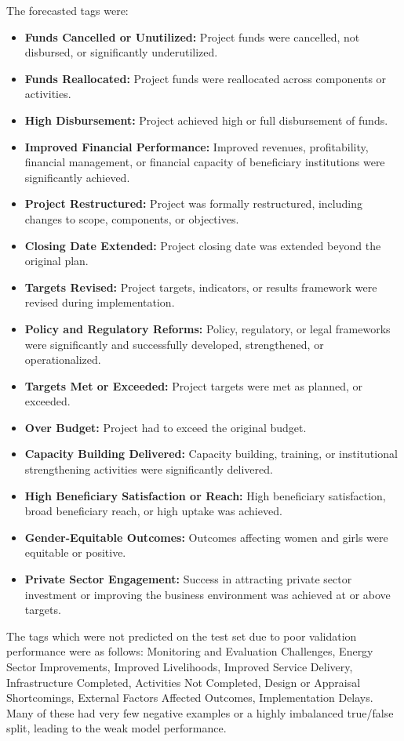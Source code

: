 The forecasted tags were:
\begin{itemize}
    \item \textbf{Funds Cancelled or Unutilized:} Project funds were cancelled, not disbursed, or significantly underutilized.
    \item \textbf{Funds Reallocated:} Project funds were reallocated across components or activities.
    \item \textbf{High Disbursement:} Project achieved high or full disbursement of funds.
    \item \textbf{Improved Financial Performance:} Improved revenues, profitability, financial management, or financial capacity of beneficiary institutions were significantly achieved.
    \item \textbf{Project Restructured:} Project was formally restructured, including changes to scope, components, or objectives.
    \item \textbf{Closing Date Extended:} Project closing date was extended beyond the original plan.
    \item \textbf{Targets Revised:} Project targets, indicators, or results framework were revised during implementation.
    \item \textbf{Policy and Regulatory Reforms:} Policy, regulatory, or legal frameworks were significantly and successfully developed, strengthened, or operationalized.
    \item \textbf{Targets Met or Exceeded:} Project targets were met as planned, or exceeded.
    \item \textbf{Over Budget:} Project had to exceed the original budget.
    \item \textbf{Capacity Building Delivered:} Capacity building, training, or institutional strengthening activities were significantly delivered.
    \item \textbf{High Beneficiary Satisfaction or Reach:} High beneficiary satisfaction, broad beneficiary reach, or high uptake was achieved.
    \item \textbf{Gender-Equitable Outcomes:} Outcomes affecting women and girls were equitable or positive.
    \item \textbf{Private Sector Engagement:} Success in attracting private sector investment or improving the business environment was achieved at or above targets.
\end{itemize}

The tags which were not predicted on the test set due to poor validation performance were as follows:  Monitoring and Evaluation Challenges, Energy Sector Improvements, Improved Livelihoods, Improved Service Delivery, Infrastructure Completed, Activities Not Completed, Design or Appraisal Shortcomings, External Factors Affected Outcomes, Implementation Delays. Many of these had very few negative examples or a highly imbalanced true/false split, leading to the weak model performance. 


